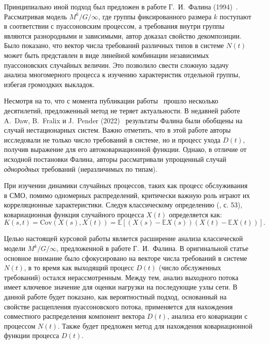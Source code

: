 \documentclass[12pt]{article}
\theoremstyle{plain}
\theoremstyle{definition}
\theoremstyle{remark}
\begin{document}
Принципиально иной подход был предложен в работе Г.~И.~Фалина (1994)~\cite{falin1994}. Рассматривая модель $M^k/G/\infty$, где группы фиксированного размера $k$ поступают в соответствии с пуассоновским процессом, а требования внутри группы являются разнородными и зависимыми, автор доказал свойство декомпозиции. Было показано, что вектор числа требований различных типов в системе $N(t)$ может быть представлен в виде линейной комбинации независимых пуассоновских случайных величин. Это позволило свести сложную задачу анализа многомерного процесса к изучению характеристик отдельной группы, избегая громоздких выкладок.

Несмотря на то, что с момента публикации работы~\cite{falin1994} прошло несколько десятилетий, предложенный метод не теряет актуальности. В недавней работе A.~Daw, B.~Fralix и J.~Pender (2022)~\cite{daw2022} результаты Фалина были обобщены на случай нестационарных систем. Важно отметить, что в этой работе авторы исследовали не только число требований в системе, но и процесс ухода $D(t)$, получив выражение для его автоковариационной функции. Однако, в отличие от исходной постановки Фалина, авторы рассматривали упрощенный случай \textit{однородных} требований (неразличимых по типам).

При изучении динамики случайных процессов, таких как процесс обслуживания в СМО, помимо одномерных распределений, критически важную роль играют их корреляционные характеристики. Следуя классическому определению (\cite{bulinsky2005}, с. 53), ковариационная функция случайного процесса $X(t)$ определяется как:
\begin{equation}
    K(s, t) = \text{Cov}(X(s), X(t)) = \mathbb{E}\left[ (X(s) - \mathbb{E}X(s)) (X(t) - \mathbb{E}X(t)) \right].
\end{equation}

Целью настоящей курсовой работы является расширение анализа классической модели $M^k/G/\infty$, предложенной в работе Г.~И.~Фалина. В оригинальной статье основное внимание было сфокусировано на векторе числа требований в системе $N(t)$, в то время как выходящий процесс $D(t)$ (число обслуженных требований) остался нерассмотренным. Между тем, анализ выходного потока имеет ключевое значение для оценки нагрузки на последующие узлы сети. В данной работе будет показано, как вероятностный подход, основанный на свойстве расщепления пуассоновского потока, применяется для нахождения совместного распределения компонент вектора $D(t)$, анализа его ковариации с процессом $N(t)$. Также будет предложен метод для нахождения ковариационной функции процесса $D(t)$.
\end{document}
